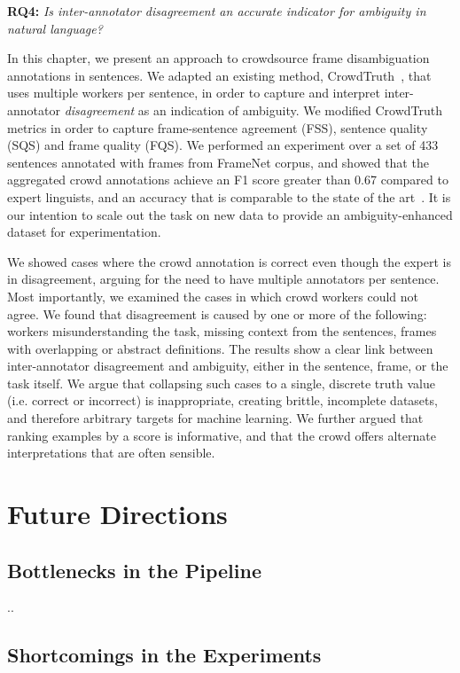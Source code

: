\textbf{RQ4:} \textit{Is inter-annotator disagreement an accurate indicator for ambiguity in natural language?}

In this chapter, we present an approach to crowdsource frame disambiguation annotations in sentences. We adapted an existing method, CrowdTruth~\cite{aroyo2014threesides}, that uses multiple workers per sentence, in order to capture and interpret inter-annotator \emph{disagreement} as an indication of ambiguity. We modified CrowdTruth metrics in order to capture frame-sentence agreement (FSS), sentence quality (SQS) and frame quality (FQS). We performed an experiment over a set of 433 sentences annotated with frames from FrameNet corpus, and showed that the aggregated crowd annotations achieve an F1 score greater than 0.67 compared to expert linguists, and an accuracy that is comparable to the state of the art~\cite{Hong:2011:GCR:2018966.2018970}. It is our intention to scale out the task on new data to provide an ambiguity-enhanced dataset for experimentation.

We showed cases where the crowd annotation is correct even though the expert is in disagreement, arguing for the need to have multiple annotators per sentence. Most importantly, we examined the cases in which crowd workers could not agree. We found that disagreement is caused by one or more of the following: workers misunderstanding the task, missing context from the sentences, frames with overlapping or abstract definitions. The results show a clear link between inter-annotator disagreement and ambiguity, either in the sentence, frame, or the task itself. We argue that collapsing such cases to a single, discrete truth value (i.e. correct or incorrect) is inappropriate, creating brittle, incomplete datasets, and therefore arbitrary targets for machine learning.  We further argued that ranking examples by a score is informative, and that the crowd offers alternate interpretations that are often sensible.


\section{Future Directions}

\subsection{Bottlenecks in the Pipeline}

..

\subsection{Shortcomings in the Experiments}


